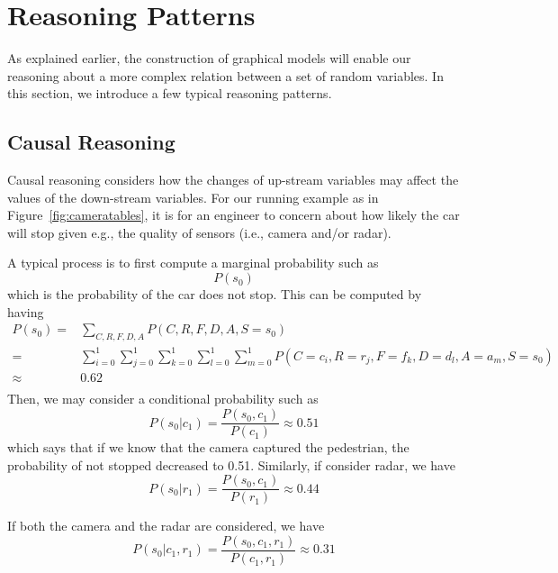 \section{Reasoning Patterns}

As explained earlier, the construction of graphical models will enable our reasoning about a more complex relation between a set of random variables. In this section, we introduce a few typical reasoning patterns. 

\subsection{Causal Reasoning}

Causal reasoning considers how the changes of up-stream variables may affect the values of the down-stream variables. For our running example as in Figure~\ref{fig:cameratables}, it is for  an engineer to concern about how likely the car will stop given e.g., the quality of sensors (i.e., camera and/or radar). 

A typical process is to first compute a marginal probability such as 
\begin{equation}
    P(s_0) 
\end{equation}
which is the probability of the car does not stop. This can be computed by having 
\begin{equation}
\begin{array}{rl}
    P(s_0) = & \displaystyle\sum_{C,R,F,D,A} P(C,R,F,D,A,S=s_0) \\
    = & \displaystyle\sum_{i=0}^1\sum_{j=0}^1\sum_{k=0}^1\sum_{l=0}^1\sum_{m=0}^1 P(C=c_i,R=r_j,F=f_k,D=d_l,A=a_m,S=s_0)\\
    \approx & 0.62\\
\end{array}
\end{equation}
Then, we may consider a conditional probability such as 
\begin{equation}
    P(s_0|c_1) = \frac{P(s_0,c_1)}{P(c_1)} \approx 0.51
\end{equation}
which says that if we know that the camera captured the pedestrian, the probability of not stopped decreased to 0.51. Similarly, if  consider radar,  we have 
\begin{equation}
    P(s_0|r_1) = \frac{P(s_0,c_1)}{P(r_1)} \approx 0.44
\end{equation}

If both the camera and the radar are considered, we have 
\begin{equation}
    P(s_0|c_1,r_1) = \frac{P(s_0,c_1,r_1)}{P(c_1,r_1)} \approx 0.31
\end{equation}




